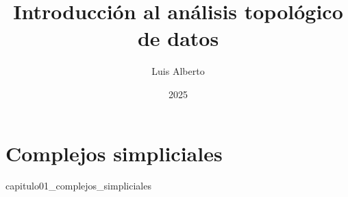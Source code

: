 \documentclass[12pt,oneside]{book}
\theoremstyle{definition}
\begin{document}
\author{Luis Alberto}
\title{Introducción al análisis topológico de datos}
\date{2025}

\frontmatter
\maketitle
\tableofcontents

\mainmatter
\chapter{Complejos simpliciales}
{capitulo01_complejos_simpliciales}

\backmatter
\end{document}
